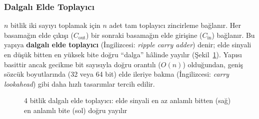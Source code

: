 \subsubsection{Dalgalı Elde Toplayıcı}

$n$ bitlik iki sayıyı toplamak için $n$ adet tam toplayıcı zincirleme bağlanır. Her basamağın elde çıkışı ($C_{\text{out}}$) bir sonraki basamağın elde girişine ($C_{\text{in}}$) bağlanır. Bu yapıya \textbf{dalgalı elde toplayıcı} (İngilizcesi: \textit{ripple carry adder}) denir; elde sinyali en düşük bitten en yüksek bite doğru ``dalga'' hâlinde yayılır (Şekil~\ref{fig:B.dalgali-elde}). Yapısı basittir ancak gecikme bit sayısıyla doğru orantılı ($O(n)$) olduğundan, geniş sözcük boyutlarında (32 veya 64 bit) elde ileriye bakma (İngilizcesi: \textit{carry lookahead}) gibi daha hızlı tasarımlar tercih edilir.

\begin{figure}[H]
\centering
{}
\caption[4 bitlik dalgalı elde toplayıcı]{4 bitlik dalgalı elde toplayıcı: elde sinyali en az anlamlı bitten (sağ) en anlamlı bite (sol) doğru yayılır}
\label{fig:B.dalgali-elde}
\end{figure}

